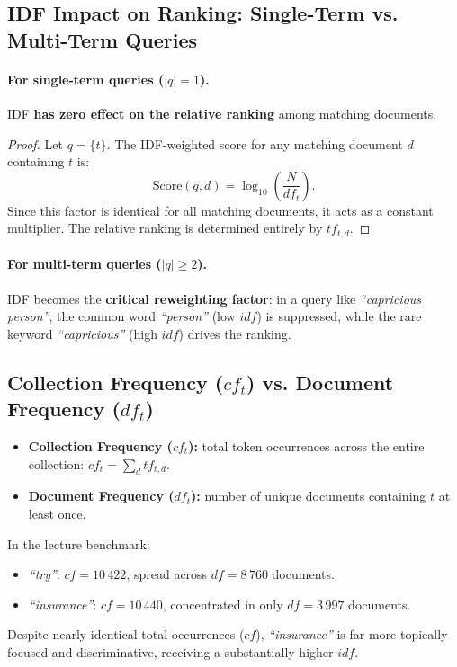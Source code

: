 \subsection{IDF Impact on Ranking: Single-Term vs. Multi-Term Queries}

\paragraph{For single-term queries ($|q| = 1$).}
IDF \textbf{has zero effect on the relative ranking} among matching documents.
\begin{proof}
Let $q = \{t\}$. The IDF-weighted score for any matching document $d$ containing $t$ is:
\begin{equation}
\text{Score}(q, d) = \log_{10}\left(\frac{N}{df_t}\right).
\end{equation}
Since this factor is identical for all matching documents, it acts as a constant multiplier. The relative ranking is determined entirely by $tf_{t,d}$.
\end{proof}

\paragraph{For multi-term queries ($|q| \ge 2$).}
IDF becomes the \textbf{critical reweighting factor}: in a query like \textit{``capricious person''}, the common word \textit{``person''} (low $idf$) is suppressed, while the rare keyword \textit{``capricious''} (high $idf$) drives the ranking.

\subsection[Collection Frequency (cf) vs. Document Frequency (df)]{Collection Frequency ($cf_t$) vs. Document Frequency ($df_t$)}
\begin{itemize}
    \item \textbf{Collection Frequency ($cf_t$):} total token occurrences across the entire collection: $cf_t = \sum_d tf_{t,d}$.
    \item \textbf{Document Frequency ($df_t$):} number of unique documents containing $t$ at least once.
\end{itemize}

\begin{example}
In the lecture benchmark:
\begin{itemize}
    \item \textit{``try''}: $cf = 10\,422$, spread across $df = 8\,760$ documents.
    \item \textit{``insurance''}: $cf = 10\,440$, concentrated in only $df = 3\,997$ documents.
\end{itemize}
Despite nearly identical total occurrences ($cf$), \textit{``insurance''} is far more topically focused and discriminative, receiving a substantially higher $idf$.
\end{example}

